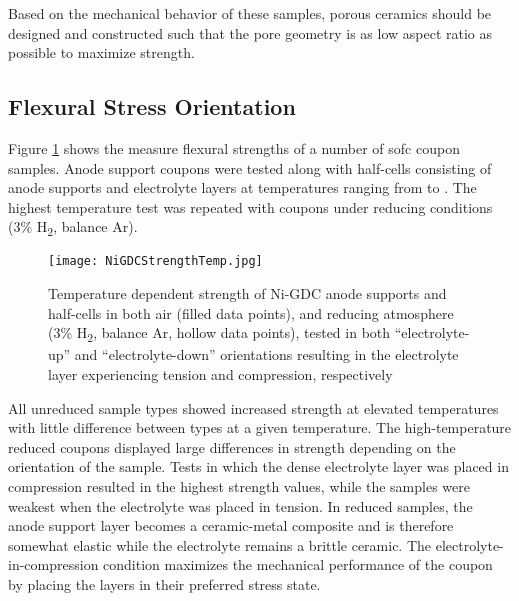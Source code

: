 Based on the mechanical behavior of these samples, porous ceramics should be designed and constructed such that the pore geometry is as low aspect ratio as possible to maximize strength.

\subsection{Flexural Stress Orientation}

Figure \ref{fig:NiGDCHalfCells} shows the measure flexural strengths of a number of \gls{sofc} coupon samples.
Anode support coupons were tested along with half-cells consisting of anode supports and electrolyte layers at temperatures ranging from  to .
The highest temperature test was repeated with coupons under reducing conditions (3\% H\textsubscript{2}, balance Ar).
\begin{figure}
    \texttt{[image: NiGDCStrengthTemp.jpg]}
    \caption{Temperature dependent strength of Ni-GDC anode supports and half-cells in both air (filled data points), and reducing atmosphere (3\% H\textsubscript{2}, balance Ar, hollow data points), tested in both ``electrolyte-up'' and ``electrolyte-down'' orientations resulting in the electrolyte layer experiencing tension and compression, respectively}
    \label{fig:NiGDCHalfCells}
\end{figure}

All unreduced sample types showed increased strength at elevated temperatures with little difference between types at a given temperature.
The high-temperature reduced coupons displayed large differences in strength depending on the orientation of the sample.
Tests in which the dense electrolyte layer was placed in compression resulted in the highest strength values, while the samples were weakest when the electrolyte was placed in tension.
In reduced samples, the anode support layer becomes a ceramic-metal composite and is therefore somewhat elastic while the electrolyte remains a brittle ceramic.
The electrolyte-in-compression condition maximizes the mechanical performance of the coupon by placing the layers in their preferred stress state.

